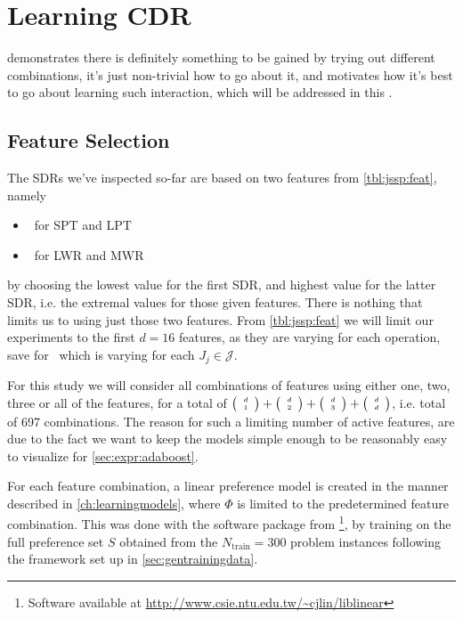 \documentclass[smallextended]{svjour3}
\begin{document}

	
	\section{Learning CDR}\label{ch:expr:CDR}
	 demonstrates there is definitely something to be gained by trying out different combinations, it's just non-trivial how to go about it, and motivates how it's best to go about learning such interaction, which will be addressed in this .
	
	\subsection{Feature Selection}
	The SDRs we've inspected so-far are based on two features from \cref{tbl:jssp:feat}, namely
	\begin{itemize}
		\item \phiproc\ for SPT and LPT 
		\item \phiwrmJob\ for LWR and MWR 
	\end{itemize}
	by choosing the lowest value for the first SDR, and highest value for the latter SDR, i.e. the extremal values for those given features. 
	There is nothing that limits us to using just those two features. 
	From \cref{tbl:jssp:feat} we will limit our experiments to the first $d=16$ features, as they are varying for each operation, save for \phitotalProc\ which is varying for each $J_j\in\mathcal{J}$. 
	
	For this study we will consider all combinations of features using either one, two, three or all of the features, for a total of $\tiny \left(\begin{array}{c}d\\1\end{array}\right)+\tiny \left(\begin{array}{c}d\\2\end{array}\right)+\tiny \left(\begin{array}{c}d\\3\end{array}\right)+\tiny \left(\begin{array}{c}d\\d\end{array}\right)$, i.e. total of 697 combinations. The reason for such a limiting number of active features, are due to the fact we want to keep the models simple enough to be reasonably easy to visualize for \cref{sec:expr:adaboost}. %
	
	For each feature combination, a linear preference model is created in the manner described in \cref{ch:learningmodels}, where $\Phi$ is limited to the predetermined feature combination. This was done with the software package from \cite{liblinear}\footnote{Software available at \url{http://www.csie.ntu.edu.tw/~cjlin/liblinear}}, by training on the full preference set $S$ obtained from the $N_{\text{train}}=300$ problem instances following the framework set up in \cref{sec:gentrainingdata}. 
	
\end{document}
